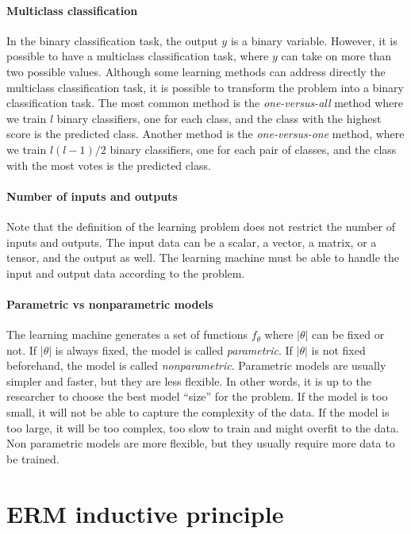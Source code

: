 \paragraph{Multiclass classification}
In the binary classification task, the output $y$ is
a binary variable.  However, it is possible to have a multiclass classification task,
where  $y$ can take on more than two possible values.  Although some learning methods can
address directly the multiclass classification task, it is possible to transform the
problem into a binary classification task.  The most common method is the
\emph{one-versus-all} method where we train $l$ binary classifiers, one for each class,
and the class with the highest score is the predicted class.  Another method is the
\emph{one-versus-one} method, where we train $l(l-1)/2$ binary classifiers, one for each
pair of classes, and the class with the most votes is the predicted class.

\paragraph{Number of inputs and outputs}
Note that the definition of the learning problem does not restrict the number of inputs
and outputs.  The input data can be a scalar, a vector, a matrix, or a tensor, and the
output as well.  The learning machine must be able to handle the input and output data
according to the problem.

\paragraph{Parametric vs nonparametric models}
The learning machine generates a set of functions $f_\theta$ where $|\theta|$ can be fixed
or not.  If $|\theta|$ is always fixed, the model is called \emph{parametric}.  If
$|\theta|$ is not fixed beforehand, the model is called \emph{nonparametric}.  Parametric
models are usually simpler and faster, but they are less flexible.  In other words, it is
up to the researcher to choose the best model ``size'' for the problem.  If the model is
too small, it will not be able to capture the complexity of the data.  If the model is too
large, it will be too complex, too slow to train and might overfit to the data. Non
parametric models are more flexible, but they usually require more data to be trained.

\section{ERM inductive principle}

